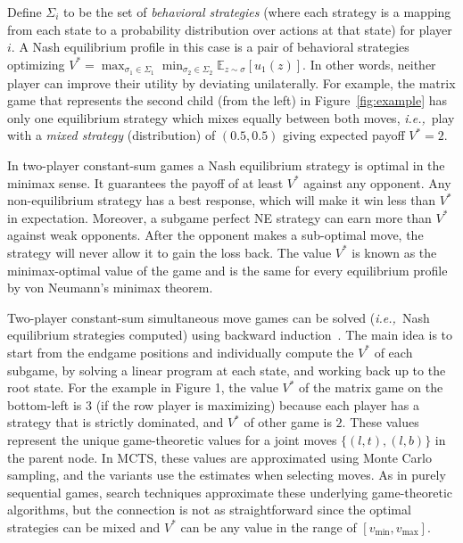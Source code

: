 \documentclass[conference]{IEEEtran}
\newcommand{\bE}{\mathbb{E}}
\newcommand{\cA}{\mathcal{A}}
\newcommand{\cS}{\mathcal{S}}
\newcommand{\ie}{{\it i.e.,}~}
\begin{document}
Define $\Sigma_i$ to be the set of {\it behavioral strategies} (where each strategy is a mapping from each state to 
a probability distribution over actions at that state) for player $i$. A Nash equilibrium profile in this case is a pair of 
behavioral strategies optimizing $V^* = \max_{\sigma_1 \in \Sigma_1} \min_{\sigma_2 \in \Sigma_2} \bE_{z \sim \sigma}[u_1(z)].$
In other words, neither player can improve their utility by deviating unilaterally. 
For example, the matrix game that represents the second child (from the left) in Figure~\ref{fig:example} has only one 
equilibrium strategy which mixes equally between both moves, \ie play with a {\it mixed strategy} (distribution) 
of $(0.5, 0.5)$ giving expected payoff $V^* = 2$. 

In two-player constant-sum games a Nash equilibrium strategy is optimal in the minimax sense. It guarantees the payoff of at least $V^*$ against any opponent. Any 
non-equilibrium strategy has a best response, which will make it win less than $V^*$ in expectation. Moreover, a subgame perfect NE strategy can earn more 
than $V^*$ against weak opponents. After the opponent makes a sub-optimal move, the strategy will never allow it to gain the loss back. 
The value $V^*$ is known as the minimax-optimal value of the game and is the same for every equilibrium profile by von Neumann's minimax theorem.

Two-player constant-sum simultaneous move games can be solved (\ie Nash equilibrium strategies computed) using backward 
induction~\cite{Ross71Goofspiel,Buro03OshiZumo,Rhoads12Computer}. The main idea is to start from the 
endgame positions and individually compute the $V^*$ of each subgame, by solving a linear program at each state, and working back up to the root state.
For the example in Figure 1, the value $V^*$ of the matrix game on the bottom-left is $3$ (if the row player is maximizing) because each player has a 
strategy that is strictly dominated, and $V^*$ of other game is $2$. These values represent the unique game-theoretic 
values for a joint moves $\{ (l,t), (l,b) \}$ in the parent node.
In MCTS, these values are approximated using Monte Carlo sampling, and the variants use the estimates when selecting moves.
As in purely sequential games, search techniques approximate these underlying game-theoretic algorithms, but  
the connection is not as straightforward since the optimal strategies can be mixed and $V^*$ can be any value 
in the range of $[v_{\min}, v_{\max}]$.
\end{document}

